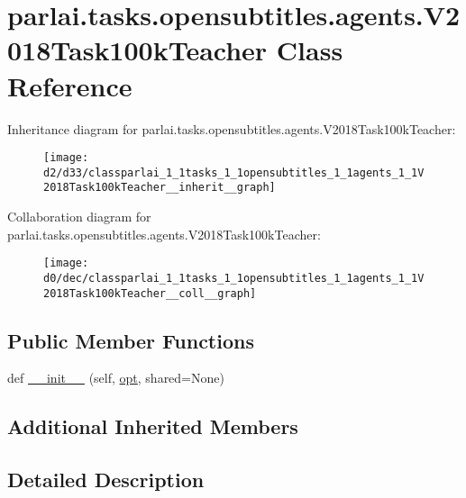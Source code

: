 \hypertarget{classparlai_1_1tasks_1_1opensubtitles_1_1agents_1_1V2018Task100kTeacher}{}\section{parlai.\+tasks.\+opensubtitles.\+agents.\+V2018\+Task100k\+Teacher Class Reference}
\label{classparlai_1_1tasks_1_1opensubtitles_1_1agents_1_1V2018Task100kTeacher}


Inheritance diagram for parlai.\+tasks.\+opensubtitles.\+agents.\+V2018\+Task100k\+Teacher\+:
\nopagebreak
\begin{figure}[H]
\begin{center}
\leavevmode
\texttt{[image: d2/d33/classparlai\_1\_1tasks\_1\_1opensubtitles\_1\_1agents\_1\_1V2018Task100kTeacher\_\_inherit\_\_graph]}
\end{center}
\end{figure}


Collaboration diagram for parlai.\+tasks.\+opensubtitles.\+agents.\+V2018\+Task100k\+Teacher\+:
\nopagebreak
\begin{figure}[H]
\begin{center}
\leavevmode
\texttt{[image: d0/dec/classparlai\_1\_1tasks\_1\_1opensubtitles\_1\_1agents\_1\_1V2018Task100kTeacher\_\_coll\_\_graph]}
\end{center}
\end{figure}
\subsection*{Public Member Functions}
\begin{DoxyCompactItemize}
\item 
def \hyperlink{classparlai_1_1tasks_1_1opensubtitles_1_1agents_1_1V2018Task100kTeacher_a7a99a122c49fcc88a4a9f5261a4fefcb}{\+\_\+\+\_\+init\+\_\+\+\_\+} (self, \hyperlink{classparlai_1_1core_1_1teachers_1_1FbDialogTeacher_af7a9ec497b9cd0292d7b8fa220da7c28}{opt}, shared=None)
\end{DoxyCompactItemize}
\subsection*{Additional Inherited Members}


\subsection{Detailed Description}


